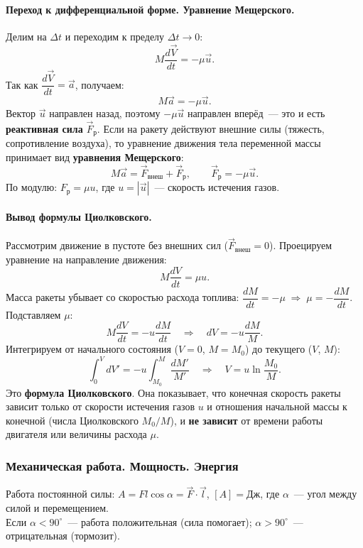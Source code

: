 \documentclass[12pt]{article}
\begin{document}
\paragraph{Переход к дифференциальной форме. Уравнение Мещерского.}
Делим на $\Delta t$ и переходим к пределу $\Delta t \to 0$:
\[
	M\frac{d\vec{V}}{dt} = -\mu\vec{u}.
\]
Так как $\dfrac{d\vec{V}}{dt} = \vec{a}$, получаем:
\[
	M\vec{a} = -\mu\vec{u}.
\]
Вектор $\vec{u}$ направлен назад, поэтому $-\mu\vec{u}$ направлен вперёд~--- это и есть \textbf{реактивная сила} $\vec{F}_{\text{р}}$.
Если на ракету действуют внешние силы (тяжесть, сопротивление воздуха), то уравнение движения тела переменной массы принимает вид \textbf{уравнения Мещерского}:
\[
	M\vec{a} = \vec{F}_{\text{внеш}} + \vec{F}_{\text{р}}, \qquad \vec{F}_{\text{р}} = -\mu\vec{u}.
\]
По модулю: $F_{\text{р}} = \mu u$, где $u = |\vec{u}|$~--- скорость истечения газов.

\paragraph{Вывод формулы Циолковского.}
Рассмотрим движение в пустоте без внешних сил ($\vec{F}_{\text{внеш}} = 0$). Проецируем уравнение на направление движения:
\[
	M\frac{dV}{dt} = \mu u.
\]
Масса ракеты убывает со скоростью расхода топлива: $\dfrac{dM}{dt} = -\mu \;\Rightarrow\; \mu = -\dfrac{dM}{dt}$.
Подставляем $\mu$:
\[
	M\frac{dV}{dt} = -u\frac{dM}{dt} \quad \Longrightarrow \quad dV = -u\frac{dM}{M}.
\]
Интегрируем от начального состояния ($V=0$, $M=M_0$) до текущего ($V$, $M$):
\[
	\int_0^V dV' = -u \int_{M_0}^{M} \frac{dM'}{M'} \quad \Longrightarrow \quad V = u\ln\frac{M_0}{M}.
\]
Это \textbf{формула Циолковского}. Она показывает, что конечная скорость ракеты зависит только от скорости истечения газов $u$ и отношения начальной массы к конечной (числа Циолковского $M_0/M$), и \textbf{не зависит} от времени работы двигателя или величины расхода $\mu$.

\subsubsection{Механическая работа. Мощность. Энергия}

\begin{definition}
	Работа постоянной силы: $A = F l \cos\alpha = \vec{F} \cdot \vec{l}$, $[A] = \text{Дж}$, где $\alpha$~--- угол между силой и перемещением.\\
	Если $\alpha < 90^\circ$~--- работа положительная (сила помогает); $\alpha > 90^\circ$~--- отрицательная (тормозит).
\end{definition}
\end{document}
